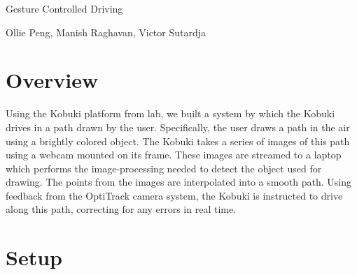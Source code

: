 \documentclass[10pt]{article}
\newenvironment{Figure}
  {\par\medskip\noindent\minipage{\linewidth}}
  {\endminipage\par\medskip}
\begin{document}
\begin{center}
  \Large Gesture Controlled Driving
\end{center}
\begin{center}
  Ollie Peng, Manish Raghavan, Victor Sutardja
\end{center}
\begin{multicols}{2}
  \section*{Overview}
  Using the Kobuki platform from lab, we built a system by which the Kobuki
  drives in a path drawn by the user. Specifically, the user draws a path in the
  air using a brightly colored object. The Kobuki takes a series of images of
  this path using a webcam mounted on its frame. These images are streamed to a
  laptop which performs the image-processing needed to detect the object used
  for drawing. The points from the images are interpolated into a smooth path.
  Using feedback from the OptiTrack camera system, the Kobuki is instructed to
  drive along this path, correcting for any errors in real time.

  \section*{Setup}
  \begin{Figure}
     \label{fig:info}
  \end{Figure}


\end{multicols}
\end{document}
